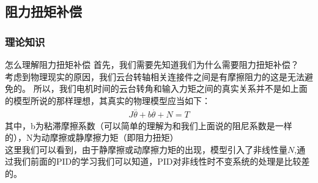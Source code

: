 \documentclass[UTF8,a4paper,12pt]{ctexart}
\begin{document}
        \subsection{阻力扭矩补偿}
          \subsubsection{理论知识}
          \begin{titlebox}{怎么理解阻力扭矩补偿}
            首先，我们需要先知道我们为什么需要阻力扭矩补偿？\\
            考虑到物理现实的原因，我们云台转轴相关连接件之间是有摩擦阻力的这是无法避免的。
            所以，我们电机时间的云台转角和输入力矩之间的真实关系并不是如上面的模型所说的那样理想，其真实的物理模型应当如下：
            \begin{align*}
              J\overset{..}{\theta}+b\overset{.}{\theta}+N=T
           \end{align*}
           其中，b为粘滞摩擦系数（可以简单的理解为和我们上面说的阻尼系数是一样的），N为动摩擦或静摩擦力矩（即阻力扭矩）
           \\这里我们可以看到，由于静摩擦或动摩擦力矩的出现，模型引入了非线性量$N$,通过我们前面的PID的学习我们可以知道，PID对非线性时不变系统的处理是比较差的。
           

\end{titlebox}
\end{document}
